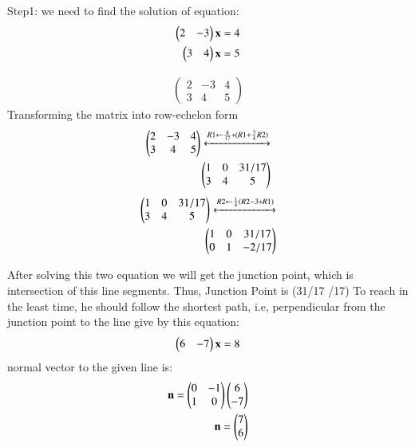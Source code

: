 Step1: we need to find the solution of equation:\\
\begin{align}
\begin{pmatrix}2 & -3\end{pmatrix}\textbf{x} = 4 \label{eqn:solutions/line_plane/601}\\
\begin{pmatrix}3 & 4\end{pmatrix}\textbf{x} = 5\label{eqn:solutions/line_plane/602}
\end{align}


\begin{align}
\begin{pmatrix}
    2 & -3 & 4 \\ 
    3 & 4 & 5
\end{pmatrix} \label{eqn:solutions/line_plane/603}
\end{align}
Transforming the matrix into row-echelon form \\
\begin{align}
\begin{pmatrix}
2 & -3 & 4 \\
3 & 4 & 5\\
\end{pmatrix}
  \xleftrightarrow[]{R1 \leftarrow \frac{4}{17}*(R1+ \frac{3}{4}R2) } \nonumber \label{eqn:solutions/line_plane/604} \\
\begin{pmatrix}
1 & 0 & 31/17 \\
3 & 4 & 5
\end{pmatrix}
\end{align}
\begin{align}
\begin{pmatrix}
1 & 0 & 31/17 \\
3 & 4 & 5
\end{pmatrix}
  \xleftrightarrow[]{R2 \leftarrow \frac{1}{4} (R2- 3*R1) } \nonumber \label{eqn:solutions/line_plane/605}  \\
\begin{pmatrix}
1 & 0 & 31/17 \\
0 & 1 & -2/17
\end{pmatrix}
\end{align}

After solving this two equation we will get the junction point, which is intersection of this line segments.
Thus, Junction Point is (31/17 /17)
To reach in the least time, he should follow the shortest path, i.e, perpendicular from the junction point to the line give by this equation:
\begin{align}
\begin{pmatrix}6 & -7\end{pmatrix}\textbf{x} = 8 \label{eqn:solutions/line_plane/606}
\end{align}
normal vector to the given line is:
\begin{align}
\mathbf{n}=\begin{pmatrix}0 & -1\\ 1 & 0\end{pmatrix}\begin{pmatrix}6 \\ -7\end{pmatrix}\label{eqn:solutions/line_plane/607}\\
\mathbf{n}=\begin{pmatrix}7\\6\end{pmatrix}  \label{eqn:solutions/line_plane/608} 
\end{align}

